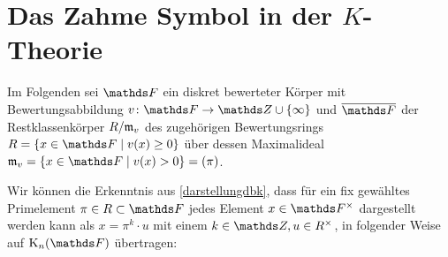 \documentclass[ngerman,fontsize=11pt, paper=a4, parskip=half, titlepage=true, toc=bib]{scrartcl}
\begin{document}

\section{Das Zahme Symbol in der $K$-Theorie}
Im Folgenden sei $\F$ ein diskret bewerteter Körper mit
Bewertungsabbildung $v\colon \F\to\Z\cup\{\infty\}$ und
$\overline{\F}$ der Restklassenkörper $R/\mathfrak{m}_v$ 
des zugehörigen Bewertungsrings $R=\left\{x\in\F\mid v(x)\geq0\right\}$
über dessen Maximalideal $\frakm_v=\left\{x\in\F\mid v(x)>0\right\}=(\pi)$.

Wir können die Erkenntnis aus \ref{darstellungdbk},
dass für ein fix gewähltes Primelement $\pi\in R\subset \F$
jedes Element $x\in\Fx$ dargestellt werden kann als 
$x=\pi^k\cdot u$ mit einem $k\in\Z, u\in \Rx$,
in folgender Weise auf $\KnF$ übertragen:
\end{document}
